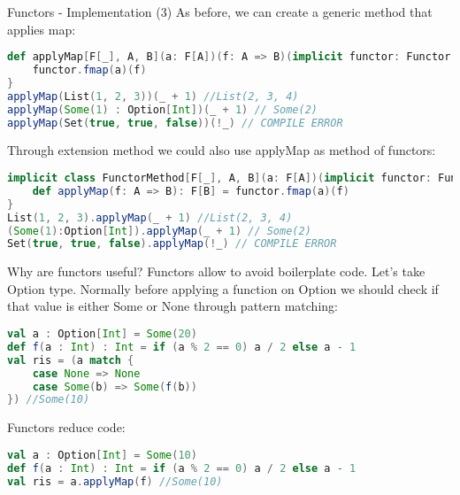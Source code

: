 \begin{frame}[fragile]{Functors - Implementation (3)}			
	As before, we can create a generic method that applies map:
\begin{lstlisting}[language=scala]
def applyMap[F[_], A, B](a: F[A])(f: A => B)(implicit functor: Functor[F]): F[B] = {
	functor.fmap(a)(f)
}
applyMap(List(1, 2, 3))(_ + 1) //List(2, 3, 4)
applyMap(Some(1) : Option[Int])(_ + 1) // Some(2)
applyMap(Set(true, true, false))(!_) // COMPILE ERROR
\end{lstlisting}	
	Through extension method we could also use applyMap as method of functors:
\begin{lstlisting}[language=scala]
implicit class FunctorMethod[F[_], A, B](a: F[A])(implicit functor: Functor[F]) {
	def applyMap(f: A => B): F[B] = functor.fmap(a)(f)
}
List(1, 2, 3).applyMap(_ + 1) //List(2, 3, 4)
(Some(1):Option[Int]).applyMap(_ + 1) // Some(2)
Set(true, true, false).applyMap(!_) // COMPILE ERROR
\end{lstlisting}	
\end{frame}

\begin{frame}[fragile]{Why are functors useful?}
	Functors allow to avoid boilerplate code.
	Let's take Option type. 
	Normally before applying a function on Option we should check if that value is either Some or None through pattern matching:
\begin{lstlisting}[language=scala]
val a : Option[Int] = Some(20)
def f(a : Int) : Int = if (a % 2 == 0) a / 2 else a - 1
val ris = (a match {
	case None => None
	case Some(b) => Some(f(b))
}) //Some(10)
\end{lstlisting}	
	
	Functors reduce code:
\begin{lstlisting}[language=scala]
val a : Option[Int] = Some(10)
def f(a : Int) : Int = if (a % 2 == 0) a / 2 else a - 1
val ris = a.applyMap(f) //Some(10)
\end{lstlisting}
\end{frame}